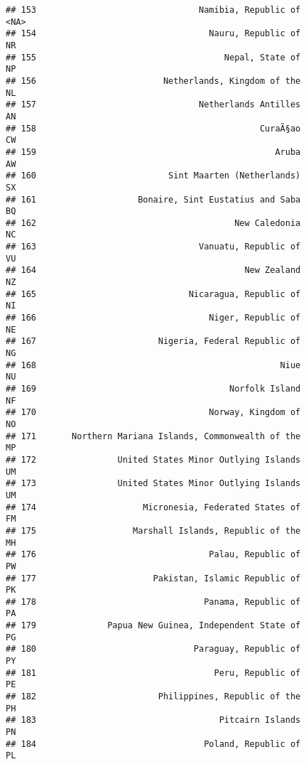 \documentclass[
]{article}
\begin{document}
\begin{verbatim}
## 153                                Namibia, Republic of                    <NA>
## 154                                  Nauru, Republic of                      NR
## 155                                     Nepal, State of                      NP
## 156                         Netherlands, Kingdom of the                      NL
## 157                                Netherlands Antilles                      AN
## 158                                            CuraÃ§ao                      CW
## 159                                               Aruba                      AW
## 160                          Sint Maarten (Netherlands)                      SX
## 161                    Bonaire, Sint Eustatius and Saba                      BQ
## 162                                       New Caledonia                      NC
## 163                                Vanuatu, Republic of                      VU
## 164                                         New Zealand                      NZ
## 165                              Nicaragua, Republic of                      NI
## 166                                  Niger, Republic of                      NE
## 167                        Nigeria, Federal Republic of                      NG
## 168                                                Niue                      NU
## 169                                      Norfolk Island                      NF
## 170                                  Norway, Kingdom of                      NO
## 171       Northern Mariana Islands, Commonwealth of the                      MP
## 172                United States Minor Outlying Islands                      UM
## 173                United States Minor Outlying Islands                      UM
## 174                     Micronesia, Federated States of                      FM
## 175                   Marshall Islands, Republic of the                      MH
## 176                                  Palau, Republic of                      PW
## 177                       Pakistan, Islamic Republic of                      PK
## 178                                 Panama, Republic of                      PA
## 179              Papua New Guinea, Independent State of                      PG
## 180                               Paraguay, Republic of                      PY
## 181                                   Peru, Republic of                      PE
## 182                        Philippines, Republic of the                      PH
## 183                                    Pitcairn Islands                      PN
## 184                                 Poland, Republic of                      PL

\end{verbatim}
\end{document}
